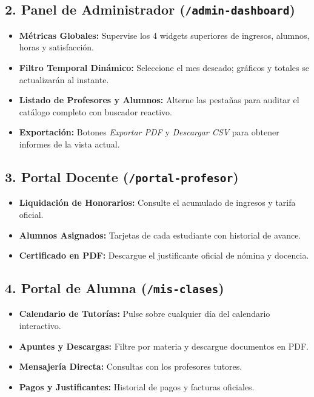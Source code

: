 \documentclass[11pt,a4paper]{article}
\begin{document}
\subsection{2. Panel de Administrador (\texttt{/admin-dashboard})}
\begin{itemize}
    \item \textbf{Métricas Globales:} Supervise los 4 widgets superiores de ingresos, alumnos, horas y satisfacción.
    \item \textbf{Filtro Temporal Dinámico:} Seleccione el mes deseado; gráficos y totales se actualizarán al instante.
    \item \textbf{Listado de Profesores y Alumnos:} Alterne las pestañas para auditar el catálogo completo con buscador reactivo.
    \item \textbf{Exportación:} Botones \textit{Exportar PDF} y \textit{Descargar CSV} para obtener informes de la vista actual.
\end{itemize}

\subsection{3. Portal Docente (\texttt{/portal-profesor})}
\begin{itemize}
    \item \textbf{Liquidación de Honorarios:} Consulte el acumulado de ingresos y tarifa oficial.
    \item \textbf{Alumnos Asignados:} Tarjetas de cada estudiante con historial de avance.
    \item \textbf{Certificado en PDF:} Descargue el justificante oficial de nómina y docencia.
\end{itemize}

\subsection{4. Portal de Alumna (\texttt{/mis-clases})}
\begin{itemize}
    \item \textbf{Calendario de Tutorías:} Pulse sobre cualquier día del calendario interactivo.
    \item \textbf{Apuntes y Descargas:} Filtre por materia y descargue documentos en PDF.
    \item \textbf{Mensajería Directa:} Consultas con los profesores tutores.
    \item \textbf{Pagos y Justificantes:} Historial de pagos y facturas oficiales.
\end{itemize}
\end{document}
